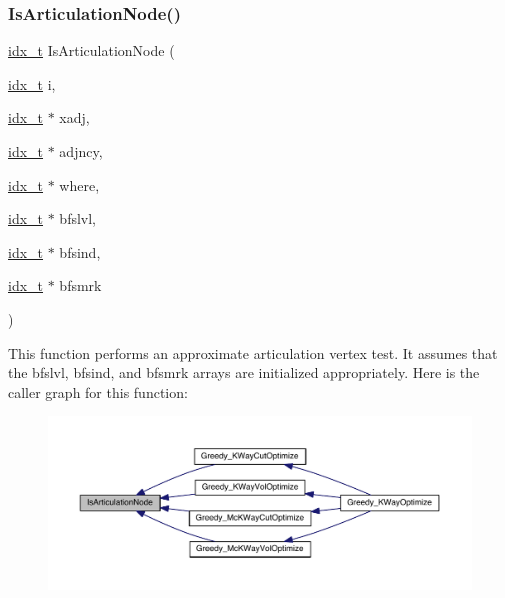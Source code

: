 \subsubsection{\texorpdfstring{Is\+Articulation\+Node()}{IsArticulationNode()}}
{\footnotesize\ttfamily \hyperlink{a00876_aaa5262be3e700770163401acb0150f52}{idx\+\_\+t} Is\+Articulation\+Node (\begin{DoxyParamCaption}\item[{\hyperlink{a00876_aaa5262be3e700770163401acb0150f52}{idx\+\_\+t}}]{i,  }\item[{\hyperlink{a00876_aaa5262be3e700770163401acb0150f52}{idx\+\_\+t} $\ast$}]{xadj,  }\item[{\hyperlink{a00876_aaa5262be3e700770163401acb0150f52}{idx\+\_\+t} $\ast$}]{adjncy,  }\item[{\hyperlink{a00876_aaa5262be3e700770163401acb0150f52}{idx\+\_\+t} $\ast$}]{where,  }\item[{\hyperlink{a00876_aaa5262be3e700770163401acb0150f52}{idx\+\_\+t} $\ast$}]{bfslvl,  }\item[{\hyperlink{a00876_aaa5262be3e700770163401acb0150f52}{idx\+\_\+t} $\ast$}]{bfsind,  }\item[{\hyperlink{a00876_aaa5262be3e700770163401acb0150f52}{idx\+\_\+t} $\ast$}]{bfsmrk }\end{DoxyParamCaption})}

This function performs an approximate articulation vertex test. It assumes that the bfslvl, bfsind, and bfsmrk arrays are initialized appropriately. Here is the caller graph for this function\+:\nopagebreak
\begin{figure}[H]
\begin{center}
\leavevmode
\includegraphics[width=350pt]{a00221_af791bf8cc50b3b218224e0560decc422_icgraph}
\end{center}
\end{figure}
\mbox{\label{a00221_ac4e797b3ea2db37f88f436fc6481b989}} 
